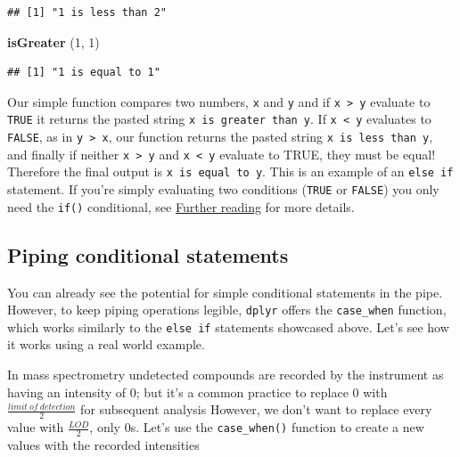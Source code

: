 \documentclass[
]{book}
\newenvironment{Shaded}{\begin{snugshade}}{\end{snugshade}}
\newcommand{\DecValTok}[1]{\textcolor[rgb]{0.00,0.00,0.81}{#1}}
\newcommand{\FunctionTok}[1]{\textcolor[rgb]{0.13,0.29,0.53}{\textbf{#1}}}
\newcommand{\NormalTok}[1]{#1}
\begin{document}
\begin{verbatim}
## [1] "1 is less than 2"
\end{verbatim}

\begin{Shaded}
\begin{Highlighting}[]
\FunctionTok{isGreater}\NormalTok{ (}\DecValTok{1}\NormalTok{, }\DecValTok{1}\NormalTok{)}
\end{Highlighting}
\end{Shaded}

\begin{verbatim}
## [1] "1 is equal to 1"
\end{verbatim}

Our simple function compares two numbers, \texttt{x} and \texttt{y} and if \texttt{x\ \textgreater{}\ y} evaluate to \texttt{TRUE} it returns the pasted string \texttt{x\ is\ greater\ than\ y}. If \texttt{x\ \textless{}\ y} evaluates to \texttt{FALSE}, as in \texttt{y\ \textgreater{}\ x}, our function returns the pasted string \texttt{x\ is\ less\ than\ y}, and finally if neither \texttt{x\ \textgreater{}\ y} and \texttt{x\ \textless{}\ y} evaluate to TRUE, they must be equal! Therefore the final output is \texttt{x\ is\ equal\ to\ y}. This is an example of an \texttt{else\ if} statement. If you're simply evaluating two conditions (\texttt{TRUE} or \texttt{FALSE}) you only need the \texttt{if()} conditional, see \protect\hyperlink{further-reading}{Further reading} for more details.

\hypertarget{piping-conditional-statements}{%
\subsection{Piping conditional statements}\label{piping-conditional-statements}}

You can already see the potential for simple conditional statements in the pipe. However, to keep piping operations legible, \texttt{dplyr} offers the \texttt{case\_when} function, which works similarly to the \texttt{else\ if} statements showcased above. Let's see how it works using a real world example.

In mass spectrometry undetected compounds are recorded by the instrument as having an intensity of 0; but it's a common practice to replace 0 with \(\frac{limit~of~detection}{2}\) for subsequent analysis However, we don't want to replace every value with \(\frac{LOD}{2}\), only 0s. Let's use the \texttt{case\_when()} function to create a new values with the recorded intensities
\end{document}

